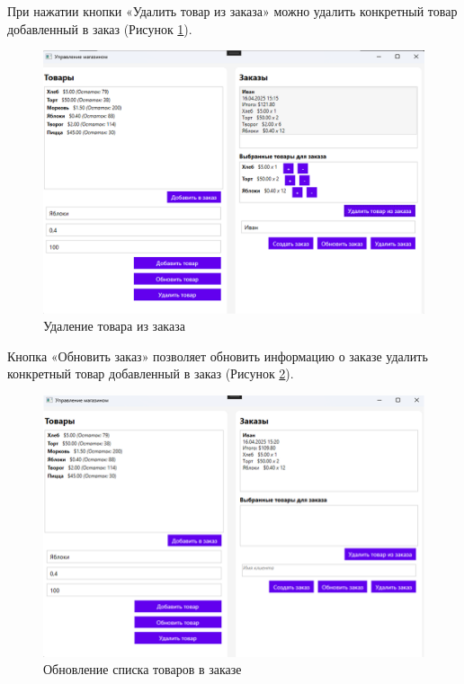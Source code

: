\documentclass[12pt]{article}
\begin{document}
\pagebreak


При нажатии кнопки «Удалить товар из заказа» можно удалить конкретный товар добавленный в заказ (Рисунок \ref{fig:demo7}).

\begin{figure}[ht]
	\centering
	\includegraphics[width=1.0\textwidth]{fig/image 64.png}
	\caption{Удаление товара из заказа}
	\label{fig:demo7}
\end{figure}

\pagebreak

Кнопка «Обновить заказ» позволяет обновить информацию о заказе удалить конкретный товар добавленный в заказ (Рисунок \ref{fig:demo8}).

\begin{figure}[ht]
	\centering
	\includegraphics[width=1.0\textwidth]{fig/image 65.png}
	\caption{Обновление списка товаров в заказе}
	\label{fig:demo8}
\end{figure}
\end{document}
